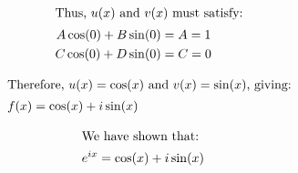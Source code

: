 \documentclass{article}
\begin{document}
\begin{align*}
\intertext{Thus, \( u(x) \) and \( v(x) \) must satisfy:}
A\cos(0) + B\sin(0) &= A = 1 \\
C\cos(0) + D\sin(0) &= C = 0
\end{align*}

\begin{align*}
\intertext{Therefore, \( u(x) = \cos(x) \) and \( v(x) = \sin(x) \), giving:}
f(x) &= \cos(x) + i\sin(x)
\end{align*}

\begin{align*}
\intertext{We have shown that:}
e^{ix} &= \cos(x) + i\sin(x)
\end{align*}
\end{document}

